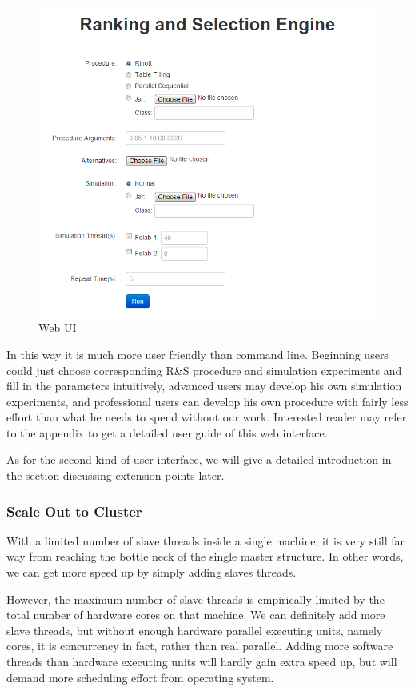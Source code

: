 \documentclass[12pt,a4paper]{report}
\begin{document}
\begin{figure}[ht]\label{web-ui}
\centering
\includegraphics[width=120mm]{rase_web.png}
\caption{Web UI}
\end{figure}

In this way it is much more user friendly than command line. Beginning users could just choose corresponding R\&S procedure and simulation experiments and fill in the parameters intuitively, advanced users may develop his own simulation experiments, and professional users can develop his own procedure with fairly less effort than what he needs to spend without our work. Interested reader may refer to the appendix to get a detailed user guide of this web interface.

As for the second kind of user interface, we will give a detailed introduction in the section discussing extension points later.

\subsubsection{Scale Out to Cluster}

With a limited number of slave threads inside a single machine, it is very still far way from reaching the bottle neck of the single master structure. In other words, we can get more speed up by simply adding slaves threads.

However, the maximum number of slave threads is empirically limited by the total number of hardware cores on that machine. We can definitely add more slave threads, but without enough hardware parallel executing units, namely cores, it is concurrency in fact, rather than real parallel. Adding more software threads than hardware executing units will hardly gain extra speed up, but will demand more scheduling effort from operating system.
\end{document}
